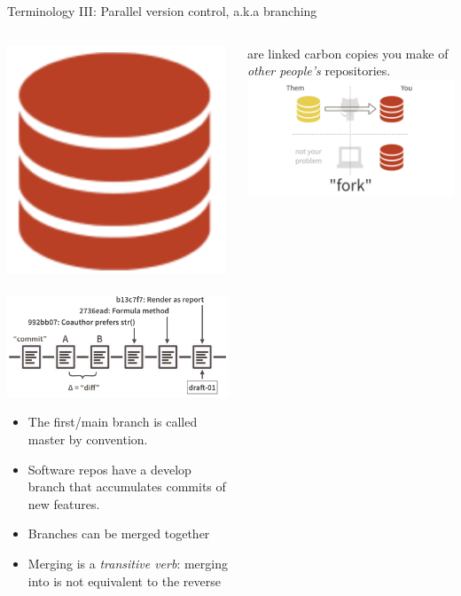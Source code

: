 \documentclass[ignorenonframetext, 10pt, aspectratio=169]{beamer}
\begin{document}
\begin{frame}{Terminology III: Parallel version control, a.k.a branching}
\begin{columns}[T]
\begin{column}{0.5\textwidth}

\centering
\includegraphics[width =0.25\linewidth]{repo-0.png} \hspace{-1em}~ \includegraphics[width =0.5\linewidth]{commit-diff-sha-tag.png}

\small
\begin{itemize}
  \item The first/main branch is called \alert{master} by convention. \pause
  \item Software repos have a \alert{develop} branch that accumulates commits of new features.\pause
  \item Branches can be \alert{merged} together
  \item Merging is a \emph{transitive verb}: merging  into  is not equivalent to the reverse
\end{itemize}
\end{column}


\begin{column}{0.25\textwidth}
are linked carbon copies you make of \emph{other people's} repositories.\\

\includegraphics[width = 1.25\linewidth]{fork.png}
\end{column}


\end{columns}
\end{frame}
\end{document}
